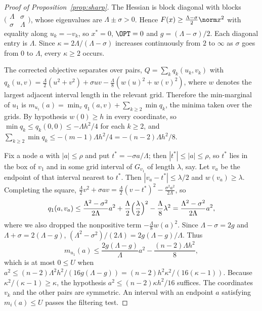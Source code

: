\begin{proof}[Proof of Proposition~\ref{prop:sharp}]

The Hessian is block diagonal with blocks
$\bigl(\begin{smallmatrix}\Lambda&\sigma\\\sigma&\Lambda\end{smallmatrix}\bigr)$,
whose eigenvalues are $\Lambda\pm\sigma>0$. Hence $F(x)\ge\frac{\Lambda-\sigma}2
\norm x^2$ with equality along $u_k=-v_k$, so $x^*=0$, $\OPT=0$ and
$g=(\Lambda-\sigma)/2$. Each diagonal entry is $\Lambda$. Since
$\kappa=2\Lambda/(\Lambda-\sigma)$ increases continuously from $2$ to
$\infty$ as $\sigma$ goes from $0$ to $\Lambda$, every $\kappa\ge2$ occurs.

The corrected objective separates over pairs,
$Q=\sum_kq_k(u_k,v_k)$ with
$q_k(u,v)=\frac\Lambda2(u^2+v^2)+\sigma uv-\frac\Lambda8(w(u)^2+w(v)^2)$,
where $w$ denotes the largest adjacent interval length in the relevant
grid. Therefore the min-marginal of $u_1$ is
$m_{u_1}(a)=\min_vq_1(a,v)+\sum_{k\ge2}\min q_k$, the minima taken over the
grids. By hypothesis $w(0)\ge h$ in every coordinate, so
$\min q_k\le q_k(0,0)\le-\Lambda h^2/4$ for each $k\ge2$, and
$\sum_{k\ge2}\min q_k\le-(m-1)\Lambda h^2/4=-(n-2)\Lambda h^2/8$.

Fix a node $a$ with $|a|\le\rho$ and put $t^*=-\sigma a/\Lambda$; then
$|t^*|\le|a|\le\rho$, so $t^*$ lies in the box of $v_1$ and in some grid
interval of $G_{v_1}$ of length $\lambda$, say. Let $v_a$ be the endpoint of
that interval nearest to $t^*$. Then $|v_a-t^*|\le\lambda/2$ and
$w(v_a)\ge\lambda$. Completing the square,
$\frac\Lambda2v^2+\sigma av=\frac\Lambda2(v-t^*)^2-\frac{\sigma^2a^2}{2\Lambda}$,
so
\[
q_1(a,v_a)\le\frac{\Lambda^2-\sigma^2}{2\Lambda}a^2
+\frac\Lambda2\Bigl(\frac\lambda2\Bigr)^2-\frac\Lambda8\lambda^2
=\frac{\Lambda^2-\sigma^2}{2\Lambda}a^2 ,
\]
where we also dropped the nonpositive term $-\frac\Lambda8w(a)^2$. Since
$\Lambda-\sigma=2g$ and $\Lambda+\sigma=2(\Lambda-g)$,
$(\Lambda^2-\sigma^2)/(2\Lambda)=2g(\Lambda-g)/\Lambda$. Thus
\[
m_{u_1}(a)\le\frac{2g(\Lambda-g)}{\Lambda}a^2-\frac{(n-2)\Lambda h^2}8,
\]
which is at most $0\le U$ when
$a^2\le(n-2)\Lambda^2h^2/(16g(\Lambda-g))=(n-2)h^2\kappa^2/(16(\kappa-1))$.
Because $\kappa^2/(\kappa-1)\ge\kappa$, the hypothesis
$a^2\le(n-2)\kappa h^2/16$ suffices. The coordinates $v_k$ and the other
pairs are symmetric. An interval with an endpoint $a$ satisfying
$m_i(a)\le U$ passes the filtering test.
\end{proof}
